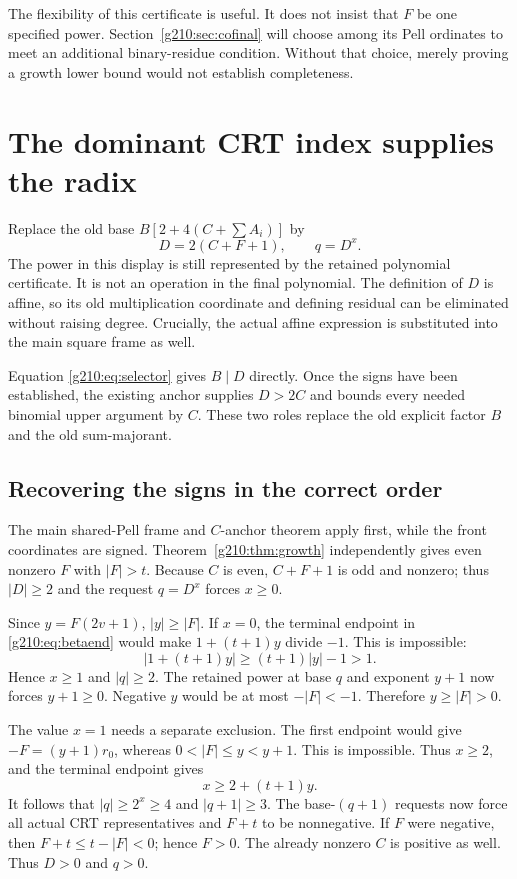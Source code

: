 The flexibility of this certificate is useful. It does not insist that $F$
be one specified power. Section~\ref{g210:sec:cofinal} will choose among its Pell
ordinates to meet an additional binary-residue condition. Without that
choice, merely proving a growth lower bound would not establish completeness.

\section{The dominant CRT index supplies the radix}\label{g210:sec:radix}

Replace the old base $B[2+4(C+\sum A_i)]$ by
\begin{equation}\label{g210:eq:newradix}
D=2(C+F+1),\qquad q=D^x.
\end{equation}
The power in this display is still represented by the retained polynomial
certificate. It is not an operation in the final polynomial. The definition
of $D$ is affine, so its old multiplication coordinate and defining residual
can be eliminated without raising degree. Crucially, the actual affine
expression is substituted into the main square frame as well.

Equation \eqref{g210:eq:selector} gives $B\mid D$ directly. Once the signs have
been established, the existing anchor supplies $D>2C$ and bounds every
needed binomial upper argument by $C$. These two roles replace the old
explicit factor $B$ and the old sum-majorant.

\subsection{Recovering the signs in the correct order}\label{g210:sec:signs}

The main shared-Pell frame and $C$-anchor theorem apply first, while the front
coordinates are signed. Theorem~\ref{g210:thm:growth} independently gives even
nonzero $F$ with $|F|>t$. Because $C$ is even, $C+F+1$ is odd and nonzero;
thus $|D|\ge2$ and the request $q=D^x$ forces $x\ge0$.

Since $y=F(2v+1)$, $|y|\ge|F|$. If $x=0$, the terminal endpoint in
\eqref{g210:eq:betaend} would make $1+(t+1)y$ divide $-1$. This is impossible:
\[
|1+(t+1)y|\ge(t+1)|y|-1>1.
\]
Hence $x\ge1$ and $|q|\ge2$. The retained power at base $q$ and exponent
$y+1$ now forces $y+1\ge0$. Negative $y$ would be at most $-|F|<-1$.
Therefore $y\ge|F|>0$.

The value $x=1$ needs a separate exclusion. The first endpoint would give
$-F=(y+1)r_0$, whereas $0<|F|\le y<y+1$. This is impossible. Thus
$x\ge2$, and the terminal endpoint gives
\begin{equation}\label{g210:eq:xbound}
x\ge2+(t+1)y.
\end{equation}
It follows that $|q|\ge2^x\ge4$ and $|q+1|\ge3$. The base-$(q+1)$
requests now force all actual CRT representatives and $F+t$ to be
nonnegative. If $F$ were negative, then $F+t\le t-|F|<0$; hence $F>0$.
The already nonzero $C$ is positive as well. Thus $D>0$ and $q>0$.

